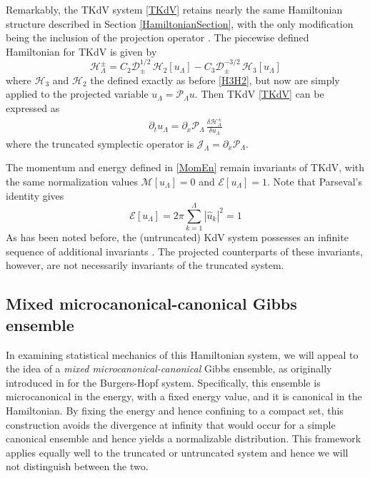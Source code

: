 \documentclass[11pt]{article}
\newcommand{\abs}[1]{\left| #1 \right|}
\newcommand{\drat}{\mathcal{D}}
\newcommand{\dratupdn}{\drat_{\pm}}
\newcommand{\En}{\mathcal{E}}
\newcommand{\Mo}{\mathcal{M}}
\newcommand{\uhat}{\hat{u}}
\newcommand{\sympJ}{\mathcal{J}}
\newcommand{\vard}[2]{\frac{\delta #1}{\delta #2}}
\newcommand{\Ham}{\mathcal{H}}
\newcommand{\Hthree}{\Ham_{3}}
\newcommand{\Htwo}{\Ham_{2}}
\newcommand{\Proj}{\mathcal{P}_{\Lambda}}
\newcommand{\uL}{u_{\Lambda}}
\newcommand{\HLupdn}{\Ham_{\Lambda}^{\pm}}
\newcommand{\SympL}{\sympJ_{\Lambda}}
\begin{document}
Remarkably, the TKdV system \eqref{TKdV} retains nearly the same Hamiltonian structure described in Section \ref{HamiltonianSection}, with the only modification being the inclusion of the projection operator \cite{bajars2013weakly, majda2019statistical}. The piecewise defined Hamiltonian for TKdV is given by
\begin{equation}
\label{TruncHamiltonian}
\HLupdn = C_2 \dratupdn^{1/2} \, \Htwo[\uL] - C_3 \dratupdn^{-3/2} \, \Hthree[\uL]
\end{equation}
where $\Hthree$ and $\Htwo$ the defined exactly as before \eqref{H3H2}, but now are simply applied to the projected variable $\uL = \Proj u$.
Then TKdV \eqref{TKdV} can be expressed as
\begin{align}
\partial_t {\uL} = \partial_x \Proj \, \vard{\HLupdn}{\uL}
\end{align}
where the truncated symplectic operator is $\SympL = \partial_x \Proj$.

The momentum and energy defined in \eqref{MomEn} remain invariants of TKdV, with the same normalization values $\Mo[\uL] = 0$ and $\En[\uL] = 1$. Note that Parseval's identity gives
\begin{equation}
\En[\uL] = 2 \pi \sum_{k=1}^{\Lambda} \abs{\uhat_k}^2 = 1
\end{equation}
As has been noted before, the (untruncated) KdV system possesses an infinite sequence of additional invariants \cite{lax1975periodic, whitham2011linear}. The projected counterparts of these invariants, however, are not necessarily invariants of the truncated system.



\subsection{Mixed microcanonical-canonical Gibbs ensemble}

In examining statistical mechanics of this Hamiltonian system, we will appeal to the idea of a {\em mixed microcanonical-canonical} Gibbs ensemble, as originally introduced in \cite{abramov2003hamiltonian} for the Burgers-Hopf system. Specifically, this ensemble is microcanonical in the energy, with a fixed energy value, and it is canonical in the Hamiltonian. By fixing the energy and hence confining to a compact set, this construction avoids the divergence at infinity that would occur for a simple canonical ensemble and hence yields a normalizable distribution. This framework applies equally well to the truncated or untruncated system and hence we will not distinguish between the two.
\end{document}
